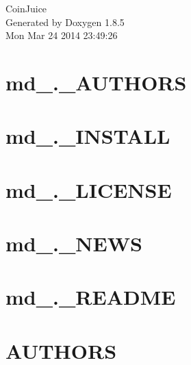 \documentclass[twoside]{book}
\newcommand{\clearemptydoublepage}{%
  \newpage{\pagestyle{empty}\cleardoublepage}%
}
\begin{document}
\hypersetup{pageanchor=false}
\begin{titlepage}
\vspace*{7cm}
\begin{center}%
{\Large Coin\-Juice }\\
\vspace*{1cm}
{\large Generated by Doxygen 1.8.5}\\
\vspace*{0.5cm}
{\small Mon Mar 24 2014 23:49:26}\\
\end{center}
\end{titlepage}
\clearemptydoublepage
\tableofcontents
\clearemptydoublepage
{}
\hypersetup{pageanchor=true}

\chapter{md\-\_\-.\-\_\-\-A\-U\-T\-H\-O\-R\-S}
\label{md__8__a_u_t_h_o_r_s}
\hypertarget{md__8__a_u_t_h_o_r_s}{}

\chapter{md\-\_\-.\-\_\-\-I\-N\-S\-T\-A\-L\-L}
\label{md__8__i_n_s_t_a_l_l}
\hypertarget{md__8__i_n_s_t_a_l_l}{}

\chapter{md\-\_\-.\-\_\-\-L\-I\-C\-E\-N\-S\-E}
\label{md__8__l_i_c_e_n_s_e}
\hypertarget{md__8__l_i_c_e_n_s_e}{}

\chapter{md\-\_\-.\-\_\-\-N\-E\-W\-S}
\label{md__8__n_e_w_s}
\hypertarget{md__8__n_e_w_s}{}

\chapter{md\-\_\-.\-\_\-\-R\-E\-A\-D\-M\-E}
\label{md__8__r_e_a_d_m_e}
\hypertarget{md__8__r_e_a_d_m_e}{}

\chapter{A\-U\-T\-H\-O\-R\-S}
\label{md__a_u_t_h_o_r_s}
\hypertarget{md__a_u_t_h_o_r_s}{}

\end{document}
